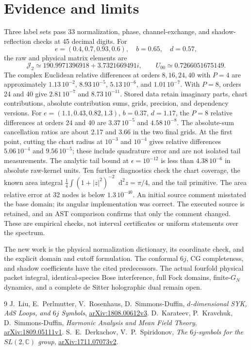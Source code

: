 \documentclass[11pt,a4paper]{article}
\newcommand{\dd}{\mathop{}\!\mathrm d}
\newcommand{\cJ}{\mathcal J}
\begin{document}
\section{Evidence and limits}
Three label sets pass 33 normalization, phase, channel-exchange, and
shadow-reflection checks at 45 decimal digits. For
\[
 e=(0.4,0.7,0.93,0.6),\quad b=0.65,\quad d=0.57,
\]
the raw and physical matrix elements are
\[
 \cJ_2\simeq190.9971396918+3.7321669491i,\qquad
 U_{00}\simeq0.7266051675149.
\]
The complex Euclidean relative differences at orders $8,16,24,40$
with $P=4$ are approximately
$1.13\,10^{-2}$, $8.93\,10^{-5}$, $5.13\,10^{-6}$, and
$1.01\,10^{-7}$. With $P=8$, orders 24 and 40 give
$2.81\,10^{-7}$ and $8.73\,10^{-11}$.
Stored data retain imaginary parts, chart contributions, absolute
contribution sums, grids, precision, and dependency versions.
For $e=(1.1,0.43,0.82,1.3)$, $b=0.37$, $d=1.17$, the $P=8$
relative differences at orders 24 and 40 are $3.37\,10^{-5}$ and
$4.58\,10^{-8}$. The absolute-sum cancellation ratios are about 2.17
and 3.66 in the two final grids. At the first point, cutting the chart
radius at $10^{-3}$ and $10^{-4}$ gives relative differences
$5.06\,10^{-4}$ and $9.56\,10^{-5}$; these include quadrature error
and are not isolated tail measurements.
The analytic tail bound at $\epsilon=10^{-12}$ is less than
$4.38\,10^{-6}$ in absolute raw-kernel units.
Ten further diagnostics check the chart coverage, the known area
integral $\frac14\int(1+|z|^2)^{-2}\dd^2z=\pi/4$, and the tail
primitive. The area relative error at 32 nodes is below $1.3\,10^{-40}$.
An initial source comment misstated the base domain; its angular
implementation was correct. The executed source is retained, and an
AST comparison confirms that only the comment changed.
These are empirical checks, not interval certificates or uniform
statements over the spectrum.

The new work is the physical normalization dictionary, its coordinate
check, and the explicit domain and cutoff formulation.
The conformal $6j$, CG completeness, and shadow coefficients have the
cited predecessors. The actual fourfold physical packet integral,
identical-species Bose interference, full Fock domains, finite-$G_N$
dynamics, and a complete de Sitter holographic dual remain open.

\begin{thebibliography}{9}
 J.~Liu, E.~Perlmutter, V.~Rosenhaus, D.~Simmons-Duffin,
\emph{$d$-dimensional SYK, AdS Loops, and $6j$ Symbols},
\href{https://arxiv.org/abs/1808.00612v3}{arXiv:1808.00612v3}.
 D.~Karateev, P.~Kravchuk, D.~Simmons-Duffin,
\emph{Harmonic Analysis and Mean Field Theory},
\href{https://arxiv.org/abs/1809.05111v1}{arXiv:1809.05111v1}.
 S.~E.~Derkachov, V.~P.~Spiridonov,
\emph{The $6j$-symbols for the $SL(2,\mathbb C)$ group},
\href{https://arxiv.org/abs/1711.07073v2}{arXiv:1711.07073v2}.
\end{thebibliography}
\end{document}
